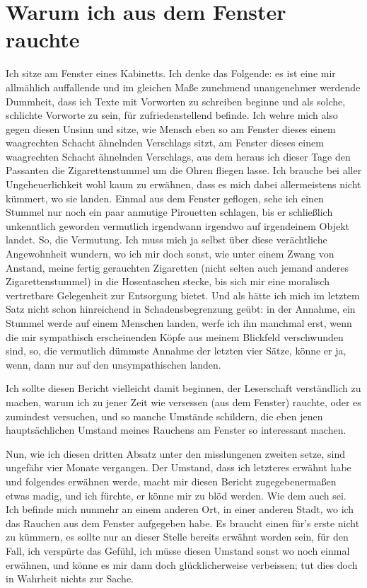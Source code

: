 \documentclass{scrbook}
\begin{document}
\chapter*{Warum ich aus dem Fenster rauchte}
 \newpage
 \noindent Ich sitze am
Fenster eines Kabinetts. Ich denke das Folgende: es
 ist eine mir allmählich
auffallende und im gleichen Maße zunehmend
 unangenehmer werdende Dummheit, dass
ich Texte mit Vorworten zu schreiben
 beginne und als solche, schlichte Vorworte
zu sein, für zufriedenstellend
 befinde. Ich wehre mich also gegen diesen Unsinn
und sitze, wie Mensch eben
 so am Fenster dieses einem waagrechten Schacht
ähnelnden Verschlags sitzt, am
 Fenster dieses einem waagrechten Schacht
ähnelnden Verschlags, aus dem heraus
 ich dieser Tage den Passanten die
Zigarettenstummel um die Ohren fliegen
 lasse. Ich brauche bei aller
Ungeheuerlichkeit wohl kaum zu erwähnen, dass es
 mich dabei allermeistens nicht
kümmert, wo sie landen. Einmal aus dem Fenster
 geflogen, sehe ich einen Stummel
nur noch ein paar anmutige Pirouetten
 schlagen, bis er schließlich unkenntlich
geworden vermutlich irgendwann
 irgendwo auf irgendeinem Objekt landet. So, die
Vermutung. Ich muss mich ja
 selbst über diese verächtliche Angewohnheit
wundern, wo ich mir doch sonst,
 wie unter einem Zwang von Anstand, meine fertig
gerauchten Zigaretten (nicht
 selten auch jemand anderes Zigarettenstummel) in
die Hosentaschen stecke, bis
 sich mir eine moralisch vertretbare Gelegenheit
zur Entsorgung bietet. Und
 als hätte ich mich im letztem Satz nicht schon
hinreichend in
 Schadensbegrenzung geübt: in der Annahme, ein Stummel werde auf
einem
 Menschen landen, werfe ich ihn manchmal erst, wenn die mir sympathisch
erscheinenden Köpfe aus meinem Blickfeld verschwunden sind, so, die
 vermutlich
dümmste Annahme der letzten vier Sätze, könne er ja, wenn, dann
 nur auf den
unsympathischen landen.

Ich sollte diesen Bericht vielleicht damit beginnen, der Leserschaft
verständlich zu machen, warum ich zu jener Zeit wie versessen (aus dem
 Fenster)
rauchte, oder es zumindest versuchen, und so manche Umstände
 schildern, die
eben jenen hauptsächlichen Umstand meines Rauchens am Fenster
 so interessant
machen.

Nun, wie ich diesen dritten Absatz unter den misslungenen zweiten setze, sind
ungefähr vier Monate vergangen. Der Umstand, dass ich letzteres erwähnt habe
und folgendes erwähnen werde, macht mir diesen Bericht zugegebenermaßen etwas
madig, und ich fürchte, er könne mir zu blöd werden. Wie dem auch sei. Ich
befinde mich nunmehr an einem anderen Ort, in einer anderen Stadt, wo ich das
Rauchen aus dem Fenster aufgegeben habe. Es braucht einen für's erste nicht
 zu
kümmern, es sollte nur an dieser Stelle bereits erwähnt worden sein, für
 den
Fall, ich verspürte das Gefühl, ich müsse diesen Umstand sonst wo noch
 einmal
erwähnen, und könne es mir dann doch glücklicherweise verbeissen; tut
 dies doch
in Wahrheit nichts zur Sache. 
\end{document}
